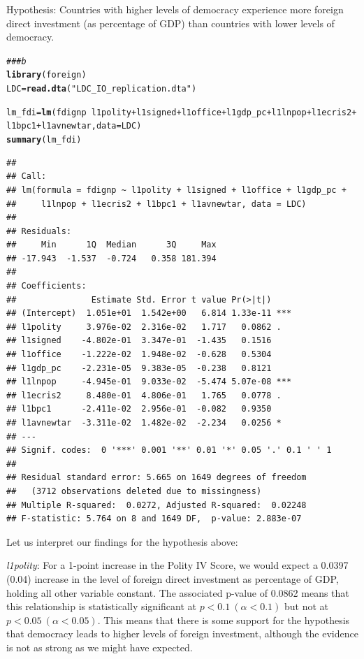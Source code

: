 \documentclass[12pt]{article}\usepackage[]{graphicx}\usepackage[]{color}
\makeatletter
\newcommand{\hlstr}[1]{\textcolor[rgb]{0.192,0.494,0.8}{#1}}%
\newcommand{\hlcom}[1]{\textcolor[rgb]{0.678,0.584,0.686}{\textit{#1}}}%
\newcommand{\hlopt}[1]{\textcolor[rgb]{0,0,0}{#1}}%
\newcommand{\hlstd}[1]{\textcolor[rgb]{0.345,0.345,0.345}{#1}}%
\newcommand{\hlkwb}[1]{\textcolor[rgb]{0.69,0.353,0.396}{#1}}%
\newcommand{\hlkwc}[1]{\textcolor[rgb]{0.333,0.667,0.333}{#1}}%
\newcommand{\hlkwd}[1]{\textcolor[rgb]{0.737,0.353,0.396}{\textbf{#1}}}%
\newenvironment{kframe}{%
 \def\at@end@of@kframe{}%
 \ifinner\ifhmode%
  \def\at@end@of@kframe{\end{minipage}}%
  \begin{minipage}{\columnwidth}%
 \fi\fi%
 \def\FrameCommand##1{\hskip\@totalleftmargin \hskip-\fboxsep
 \colorbox{shadecolor}{##1}\hskip-\fboxsep
     \hskip-\linewidth \hskip-\@totalleftmargin \hskip\columnwidth}%
 \MakeFramed {\advance\hsize-\width
   \@totalleftmargin\z@ \linewidth\hsize
   \@setminipage}}%
 {\par\unskip\endMakeFramed%
 \at@end@of@kframe}
\newenvironment{knitrout}{}{} %
\makeatother
\begin{document}
Hypothesis: Countries with higher levels of democracy experience more foreign direct investment (as percentage of GDP) than countries with lower levels of democracy.

\begin{knitrout}
\color{fgcolor}\begin{kframe}
\begin{alltt}
\hlcom{### b}
\hlkwd{library}\hlstd{(foreign)}
\hlstd{LDC} \hlkwb{=} \hlkwd{read.dta}\hlstd{(}\hlstr{"LDC_IO_replication.dta"}\hlstd{)}

\hlstd{lm_fdi} \hlkwb{=} \hlkwd{lm}\hlstd{(fdignp} \hlopt{~} \hlstd{l1polity} \hlopt{+} \hlstd{l1signed} \hlopt{+} \hlstd{l1office} \hlopt{+} \hlstd{l1gdp_pc} \hlopt{+} \hlstd{l1lnpop} \hlopt{+} \hlstd{l1ecris2} \hlopt{+}
    \hlstd{l1bpc1} \hlopt{+} \hlstd{l1avnewtar,} \hlkwc{data} \hlstd{= LDC)}
\hlkwd{summary}\hlstd{(lm_fdi)}
\end{alltt}
\begin{verbatim}
## 
## Call:
## lm(formula = fdignp ~ l1polity + l1signed + l1office + l1gdp_pc + 
##     l1lnpop + l1ecris2 + l1bpc1 + l1avnewtar, data = LDC)
## 
## Residuals:
##     Min      1Q  Median      3Q     Max 
## -17.943  -1.537  -0.724   0.358 181.394 
## 
## Coefficients:
##               Estimate Std. Error t value Pr(>|t|)    
## (Intercept)  1.051e+01  1.542e+00   6.814 1.33e-11 ***
## l1polity     3.976e-02  2.316e-02   1.717   0.0862 .  
## l1signed    -4.802e-01  3.347e-01  -1.435   0.1516    
## l1office    -1.222e-02  1.948e-02  -0.628   0.5304    
## l1gdp_pc    -2.231e-05  9.383e-05  -0.238   0.8121    
## l1lnpop     -4.945e-01  9.033e-02  -5.474 5.07e-08 ***
## l1ecris2     8.480e-01  4.806e-01   1.765   0.0778 .  
## l1bpc1      -2.411e-02  2.956e-01  -0.082   0.9350    
## l1avnewtar  -3.311e-02  1.482e-02  -2.234   0.0256 *  
## ---
## Signif. codes:  0 '***' 0.001 '**' 0.01 '*' 0.05 '.' 0.1 ' ' 1
## 
## Residual standard error: 5.665 on 1649 degrees of freedom
##   (3712 observations deleted due to missingness)
## Multiple R-squared:  0.0272,	Adjusted R-squared:  0.02248 
## F-statistic: 5.764 on 8 and 1649 DF,  p-value: 2.883e-07
\end{verbatim}
\end{kframe}
\end{knitrout}

Let us interpret our findings for the hypothesis above:

\textit{l1polity}: For a 1-point increase in the Polity IV Score, we would expect a 0.0397 (0.04) increase in the level of foreign direct investment as percentage of GDP, holding all other variable constant. The associated p-value of 0.0862 means that this relationship is statistically significant at $p < 0.1 \ (\alpha < 0.1)$ but not at $p < 0.05 \ (\alpha < 0.05)$. This means that there is some support for the hypothesis that democracy leads to higher levels of foreign investment, although the evidence is not as strong as we might have expected.
\end{document}
